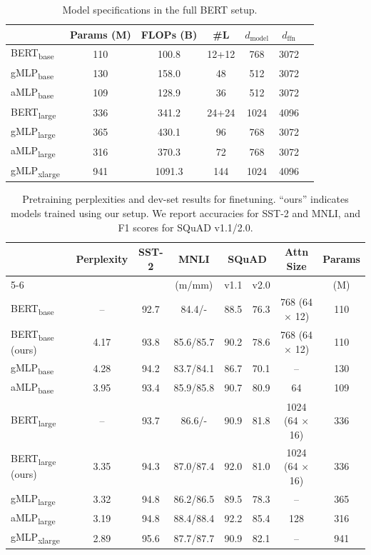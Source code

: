 \documentclass{article}
\begin{document}
\begin{table}[h]
\caption{Model specifications in the full BERT setup.}
\label{tab:perplexity-full-bert}
\small
\centering
\begin{tabular}{@{}l|cc|cccc@{}}
\toprule
 & Params (M) & FLOPs (B) & \#L & $d_\mathrm{model}$ & $d_\mathrm{ffn}$ \\
\midrule
BERT\textsubscript{base} & 110 & 100.8  & 12+12 & 768 & 3072 \\
gMLP\textsubscript{base} & 130 & 158.0 & 48 & 512 & 3072  \\
aMLP\textsubscript{base} & 109 & 128.9 & 36 & 512 & 3072  \\
\midrule
BERT\textsubscript{large} & 336 & 341.2 &  24+24 & 1024 & 4096  \\
gMLP\textsubscript{large} & 365 & 430.1 & 96 & 768 & 3072  \\
aMLP\textsubscript{large} & 316 & 370.3 & 72 & 768 & 3072 \\
\midrule
gMLP\textsubscript{xlarge} & 941 & 1091.3 & 144 & 1024 & 4096 \\
\bottomrule
\end{tabular}
\end{table}


\begin{table}[h]
\centering
\caption{Pretraining perplexities and dev-set results for finetuning. ``ours'' indicates models trained using our setup. We report accuracies for SST-2 and MNLI, and F1 scores for SQuAD v1.1/2.0.}
\begin{tabular}{@{}l|c|cccc|cc@{}}
\toprule
 & \multirow{2}{*}{Perplexity} & \multirow{2}{*}{SST-2} & \multirow{2}{*}{MNLI} & \multicolumn{2}{c|}{SQuAD} & \multirow{2}{*}{Attn Size} & Params \\ \cmidrule(l){5-6}
 & & & (m/mm) & v1.1 & v2.0 & & (M)\\
\midrule
\midrule
BERT\textsubscript{base}~\cite{devlin2018bert} & -- & 92.7 & 84.4/- & 88.5 & 76.3 & 768 (64 $\times$ 12) & 110 \\
\midrule
BERT\textsubscript{base} (ours) & 4.17 & 93.8 & 85.6/85.7 & 90.2 & 78.6 & 768 (64 $\times$ 12) & 110  \\
gMLP\textsubscript{base} & 4.28 & 94.2 & 83.7/84.1 & 86.7 & 70.1 & -- & 130 \\
aMLP\textsubscript{base} & 3.95 & 93.4 & 85.9/85.8 & 90.7 & 80.9 & 64 & 109 \\
\midrule
\midrule
BERT\textsubscript{large}~\cite{devlin2018bert} & -- & 93.7 & 86.6/- & 90.9 & 81.8 & 1024 (64 $\times$ 16) & 336 \\
\midrule
BERT\textsubscript{large} (ours) & 3.35 & 94.3 & 87.0/87.4 & 92.0 & 81.0 & 1024 (64 $\times$ 16) & 336 \\
gMLP\textsubscript{large} & 3.32 & 94.8 & 86.2/86.5 & 89.5 & 78.3 & -- & 365 \\
aMLP\textsubscript{large} & 3.19 & 94.8 & 88.4/88.4 & 92.2 & 85.4 & 128 & 316 \\
\midrule\midrule
gMLP\textsubscript{xlarge} & 2.89 & 95.6 & 87.7/87.7 & 90.9 & 82.1 & -- & 941 \\
\bottomrule
\end{tabular}
\label{tab:finetune-full-bert}
\end{table}
\end{document}
